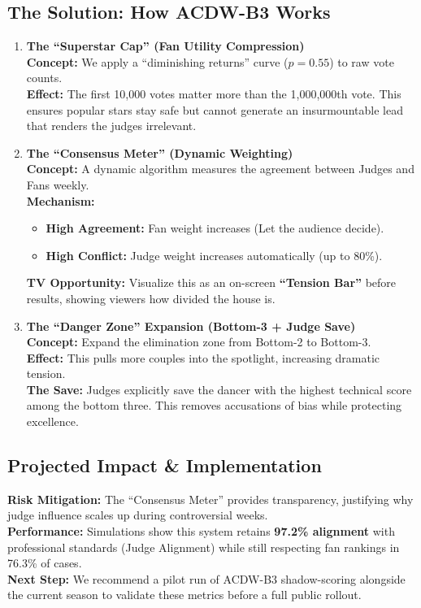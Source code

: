 \documentclass{article}
\begin{document}
\subsection*{The Solution: How ACDW-B3 Works}
\begin{enumerate}
    \item \textbf{The ``Superstar Cap'' (Fan Utility Compression)}\\
    \textbf{Concept:} We apply a ``diminishing returns'' curve ($p=0.55$) to raw vote counts.\\
    \textbf{Effect:} The first 10,000 votes matter more than the 1,000,000th vote. This ensures popular stars stay safe but cannot generate an insurmountable lead that renders the judges irrelevant.
    
    \item \textbf{The ``Consensus Meter'' (Dynamic Weighting)}\\
    \textbf{Concept:} A dynamic algorithm measures the agreement between Judges and Fans weekly.\\
    \textbf{Mechanism:}
    \begin{itemize}
        \item \textbf{High Agreement:} Fan weight increases (Let the audience decide).
        \item \textbf{High Conflict:} Judge weight increases automatically (up to 80\%).
    \end{itemize}
    \textbf{TV Opportunity:} Visualize this as an on-screen \textbf{``Tension Bar''} before results, showing viewers how divided the house is.
    
    \item \textbf{The ``Danger Zone'' Expansion (Bottom-3 + Judge Save)}\\
    \textbf{Concept:} Expand the elimination zone from Bottom-2 to Bottom-3.\\
    \textbf{Effect:} This pulls more couples into the spotlight, increasing dramatic tension.\\
    \textbf{The Save:} Judges explicitly save the dancer with the highest technical score among the bottom three. This removes accusations of bias while protecting excellence.
\end{enumerate}

\vspace{-0.5em}

\subsection*{Projected Impact \& Implementation}
\noindent\textbf{Risk Mitigation:} The ``Consensus Meter'' provides transparency, justifying why judge influence scales up during controversial weeks.\\
\textbf{Performance:} Simulations show this system retains \textbf{97.2\% alignment} with professional standards (Judge Alignment) while still respecting fan rankings in 76.3\% of cases.\\
\textbf{Next Step:} We recommend a pilot run of ACDW-B3 shadow-scoring alongside the current season to validate these metrics before a full public rollout.
\end{document}

